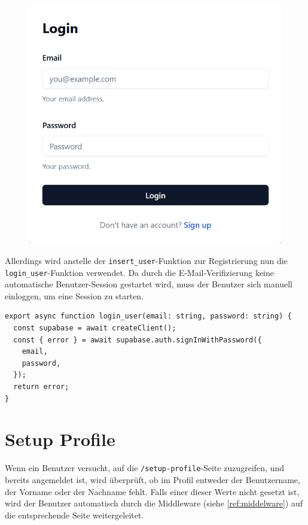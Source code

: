 \begin{inhalt}
\begin{figure}[!htb]
\centering
\includegraphics[width=1\textwidth]{files/Thomas/pics/Website/Login/login.png}
\caption[Bildbezeichnung für Abbildungsverzeichnis]{}
\label{fig:gehaeuse_internet_bild}
\end{figure}


Allerdings wird anstelle der \texttt{insert\_user}-Funktion zur Registrierung nun die \texttt{login\_user}-Funktion verwendet.
Da durch die E-Mail-Verifizierung keine automatische Benutzer-Session gestartet wird, muss der Benutzer sich manuell einloggen, um eine Session zu starten.

\begin{lstlisting}[style=mytsx]
export async function login_user(email: string, password: string) {
  const supabase = await createClient();
  const { error } = await supabase.auth.signInWithPassword({
    email,
    password,
  });
  return error;
}
\end{lstlisting}

\clearpage

\newpage

\section{Setup Profile}

Wenn ein Benutzer versucht, auf die \texttt{/setup-profile}-Seite zuzugreifen, und bereits angemeldet ist, wird überprüft, ob im Profil entweder der Benutzername, der Vorname oder der Nachname fehlt.  
Falls einer dieser Werte nicht gesetzt ist, wird der Benutzer automatisch durch die Middleware (siehe \ref{ref:middelware}) auf die entsprechende Seite weitergeleitet.


\end{inhalt}
